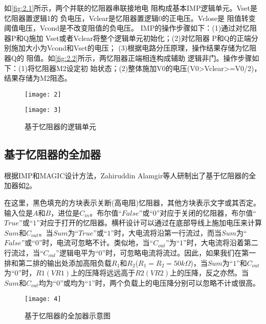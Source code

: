 \documentclass[withoutpreface,bwprint]{cumcmthesis}
\begin{document}
如\cref{fig:2.1}所示，两个并联的忆阻器串联接地电
阻构成基本IMP逻辑单元。Vset是忆阻器置逻辑1的
负电压，Vclear是忆阻器置逻辑0的正电压。Vclose是
阻值转变阈值电压，Vcond是不改变阻值的负电压。
IMP的操作步骤如下：(1)通过对忆阻器P和Q施加
Vset或者Vclear将整个逻辑单元初始化；(2)对忆阻器
P和Q的正端分别施加大小为Vcond和Vset的电压；
(3)根据电路分压原理，操作结果存储为忆阻器Q的
阻值。如\cref{fig:2.2}所示，两忆阻器正端相连构成辅助
逻辑非门。操作步骤如下：(1)将忆阻器M2设定初
始状态；(2)整体施加V0的电压(V0>Vclear>=V0/2)，
结果存储为M2阻态。

\begin{figure}[H]
    \centering
    \begin{minipage}[c]{0.45\textwidth}
        \centering
        \texttt{[image: 2]}
        \label{fig:2.1}
    \end{minipage}

    \begin{minipage}[c]{0.45\textwidth}
        \centering
        \texttt{[image: 3]}
        \label{fig:2.2}
    \end{minipage}
    \caption{基于忆阻器的逻辑单元}
    \label{fig:2}
\end{figure}

\subsection{基于忆阻器的全加器}

根据IMP和MAGIC设计方法，Zahiruddin Alamgir等人研制出了基于忆阻器的全加器如\cref{fig:3}。

在这里，黑色填充的方块表示关断(高电阻)忆阻器，其他方块表示文字或其否定。输入位是$A$和$B$，进位是$C_{in}$。布尔值“$False$”或“$0$”对应于关闭的忆阻器，布尔值“$True$”或“$1$”对应于打开的忆阻器。横杆设计可以通过在底部导线上施加电压来计算$Sum$和$C_{out}$。当$Sum$为“$True$”或“$1$”时，大电流将沿第一行流过，而当$Sum$为“$False$”或“$0$”时，电流可忽略不计。类似地，当“$C_{out}$”为“$1$”时，大电流将沿着第二行流过，当“$C_{out}$”逻辑电平为“$0$”时，可忽略电流将流过。因此，如果我们在第一排和第二排的输出处添加高阻负载$R_1$和$R_2$($R_1=R_2=50kΩ$)，当$Sum$为“$1$”和$C_{out}$为“$0$”时，$R1(VR1)$上的压降将远远高于$R2(VR2)$上的压降，反之亦然。当$Sum$和$C_{out}$均为“$0$”或均为“$1$”时，两个负载上的电压降分别可以忽略不计或很高。

\begin{figure}[H]
    \centering
    \texttt{[image: 4]}
    \caption{基于忆阻器的全加器示意图}
    \label{fig:3}
\end{figure}
\end{document}
